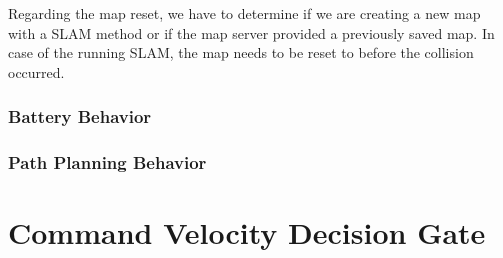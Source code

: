 Regarding the map reset, we have to determine if we are creating a new map with a SLAM method or if the map server provided a previously saved map. 
In case of the running SLAM, the map needs to be reset to before the collision occurred. 

\subsubsection{Battery Behavior}

\subsubsection{Path Planning Behavior}

\section{Command Velocity Decision Gate}


